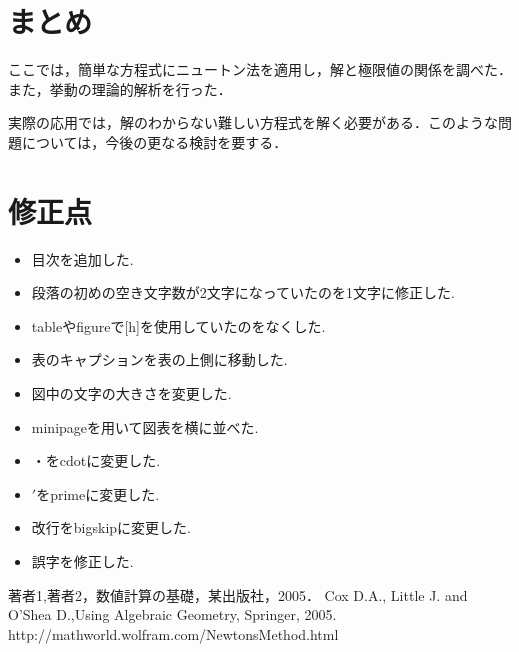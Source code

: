 \documentclass[a4j,11pt]{jarticle}
\begin{document}
\section{まとめ}
ここでは，簡単な方程式にニュートン法を適用し，解と極限値の関係を調べた．また，挙動の理論的解析を行った．

実際の応用では，解のわからない難しい方程式を解く必要がある．このような問題については，今後の更なる検討を要する．
\section{修正点}
\begin{itemize}
\item 目次を追加した.
\item 段落の初めの空き文字数が2文字になっていたのを1文字に修正した. 
\item tableやfigureで[h]を使用していたのをなくした.
\item 表のキャプションを表の上側に移動した.
\item 図中の文字の大きさを変更した.
\item minipageを用いて図表を横に並べた.
\item ・をcdotに変更した.
\item $'$をprimeに変更した.
\item 改行をbigskipに変更した.
\item 誤字を修正した.
\end{itemize}
\begin{thebibliography}{99}
 著者1,著者2，数値計算の基礎，某出版社，2005．
 Cox D.A., Little J. and O'Shea D.,Using Algebraic Geometry, Springer, 2005.
 http://mathworld.wolfram.com/NewtonsMethod.html
\end{thebibliography}
\end{document}
